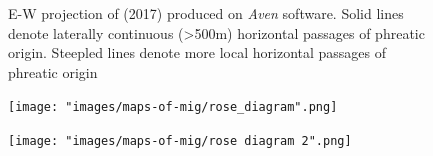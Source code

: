 \begin{figure}[t!]
 \checkoddpage \ifoddpage \forcerectofloat \else \forceversofloat \fi
\centering
{}
\caption{E-W projection of \protect{} (2017) produced on \emph{Aven} software. Solid lines denote laterally continuous (>500m) horizontal passages of phreatic origin. Steepled lines denote more local horizontal passages of phreatic origin} \label{fig:ew projection}
\end{figure}


\begin{pagefigure}
\checkoddpage \ifoddpage \forcerectofloat \else \forceversofloat \fi


\begin{subfigure}{\linewidth}
\centering
 \texttt{[image: "images/maps-of-mig/rose\_diagram".png]}
\caption{}
 \label{fig:rose diagram}
 \end{subfigure}
 \vspace{3mm}
\begin{subfigure}{\linewidth}
\centering
 \texttt{[image: "images/maps-of-mig/rose diagram 2".png]}
 \label{fig:rose diagram 2}
 \caption{}
 \end{subfigure}
 
  \caption{A rose diagram depicting the azimuth ($\phi$) of cave passages. This was extracted from a .3d file produced on Survex, where  $n$ is the number of stations, $\theta$ is the inclination angle and the radial grid is the percentage fraction of passages falling in a specific orientation \emph{(a)} $n=5084$, $\theta <45°$ and \emph{(b)} $n=912$, $\theta \ge 45 \textdegree$. Each sector is 10\textdegree wide. Bin colour shows passage length distribution}
\end{pagefigure}


